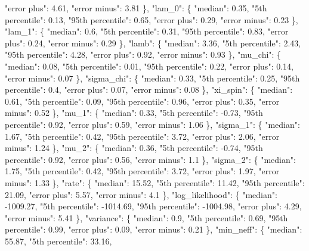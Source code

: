 {{        "error plus": 4.61, %
        "error minus": 3.81%
      \}, %
      "lam\_0": \{%
        "median": 0.35, %
        "5th percentile": 0.13, %
        "95th percentile": 0.65, %
        "error plus": 0.29, %
        "error minus": 0.23%
      \}, %
      "lam\_1": \{%
        "median": 0.6, %
        "5th percentile": 0.31, %
        "95th percentile": 0.83, %
        "error plus": 0.24, %
        "error minus": 0.29%
      \}, %
      "lamb": \{%
        "median": 3.36, %
        "5th percentile": 2.43, %
        "95th percentile": 4.28, %
        "error plus": 0.92, %
        "error minus": 0.93%
      \}, %
      "mu\_chi": \{%
        "median": 0.08, %
        "5th percentile": 0.01, %
        "95th percentile": 0.22, %
        "error plus": 0.14, %
        "error minus": 0.07%
      \}, %
      "sigma\_chi": \{%
        "median": 0.33, %
        "5th percentile": 0.25, %
        "95th percentile": 0.4, %
        "error plus": 0.07, %
        "error minus": 0.08%
      \}, %
      "xi\_spin": \{%
        "median": 0.61, %
        "5th percentile": 0.09, %
        "95th percentile": 0.96, %
        "error plus": 0.35, %
        "error minus": 0.52%
      \}, %
      "mu\_1": \{%
        "median": 0.33, %
        "5th percentile": {-}0.73, %
        "95th percentile": 0.92, %
        "error plus": 0.59, %
        "error minus": 1.06%
      \}, %
      "sigma\_1": \{%
        "median": 1.67, %
        "5th percentile": 0.42, %
        "95th percentile": 3.72, %
        "error plus": 2.06, %
        "error minus": 1.24%
      \}, %
      "mu\_2": \{%
        "median": 0.36, %
        "5th percentile": {-}0.74, %
        "95th percentile": 0.92, %
        "error plus": 0.56, %
        "error minus": 1.1%
      \}, %
      "sigma\_2": \{%
        "median": 1.75, %
        "5th percentile": 0.42, %
        "95th percentile": 3.72, %
        "error plus": 1.97, %
        "error minus": 1.33%
      \}, %
      "rate": \{%
        "median": 15.52, %
        "5th percentile": 11.42, %
        "95th percentile": 21.09, %
        "error plus": 5.57, %
        "error minus": 4.1%
      \}, %
      "log\_likelihood": \{%
        "median": {-}1009.27, %
        "5th percentile": {-}1014.69, %
        "95th percentile": {-}1004.98, %
        "error plus": 4.29, %
        "error minus": 5.41%
      \}, %
      "variance": \{%
        "median": 0.9, %
        "5th percentile": 0.69, %
        "95th percentile": 0.99, %
        "error plus": 0.09, %
        "error minus": 0.21%
      \}, %
      "min\_neff": \{%
        "median": 55.87, %
        "5th percentile": 33.16, %
}}
